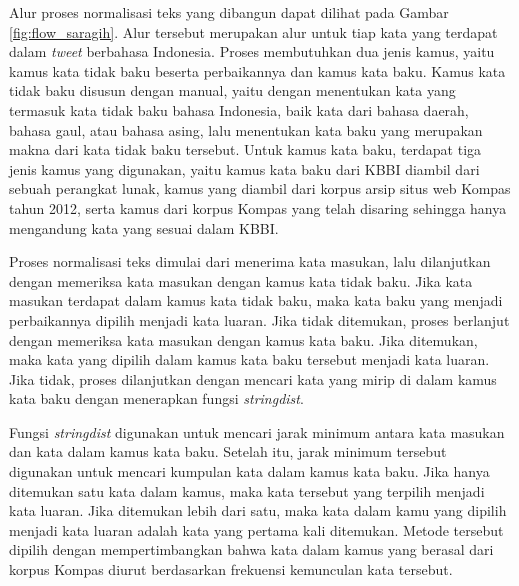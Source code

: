 Alur proses normalisasi teks yang dibangun dapat dilihat pada Gambar \ref{fig:flow_saragih}. Alur tersebut merupakan alur untuk tiap kata yang terdapat dalam \textit{tweet} berbahasa Indonesia. Proses membutuhkan dua jenis kamus, yaitu kamus kata tidak baku beserta perbaikannya dan kamus kata baku. Kamus kata tidak baku disusun dengan manual, yaitu dengan menentukan kata yang termasuk kata tidak baku bahasa Indonesia, baik kata dari bahasa daerah, bahasa gaul, atau bahasa asing, lalu menentukan kata baku yang merupakan makna dari kata tidak baku tersebut. Untuk kamus kata baku, terdapat tiga jenis kamus yang digunakan, yaitu kamus kata baku dari KBBI diambil dari sebuah perangkat lunak, kamus yang diambil dari korpus arsip situs web Kompas tahun 2012, serta kamus dari korpus Kompas yang telah disaring sehingga hanya mengandung kata yang sesuai dalam KBBI.

Proses normalisasi teks dimulai dari menerima kata masukan, lalu dilanjutkan dengan memeriksa kata masukan dengan kamus kata tidak baku. Jika kata masukan terdapat dalam kamus kata tidak baku, maka kata baku yang menjadi perbaikannya dipilih menjadi kata luaran. Jika tidak ditemukan, proses berlanjut dengan memeriksa kata masukan dengan kamus kata baku. Jika ditemukan, maka kata yang dipilih dalam kamus kata baku tersebut menjadi kata luaran. Jika tidak, proses dilanjutkan dengan mencari kata yang mirip di dalam kamus kata baku dengan menerapkan fungsi \textit{stringdist}.

Fungsi \textit{stringdist} digunakan untuk mencari jarak minimum antara kata masukan dan kata dalam kamus kata baku. Setelah itu, jarak minimum tersebut digunakan untuk mencari kumpulan kata dalam kamus kata baku. Jika hanya ditemukan satu kata dalam kamus, maka kata tersebut yang terpilih menjadi kata luaran. Jika ditemukan lebih dari satu, maka kata dalam kamu yang dipilih menjadi kata luaran adalah kata yang pertama kali ditemukan. Metode tersebut dipilih dengan mempertimbangkan bahwa kata dalam kamus yang berasal dari korpus Kompas diurut berdasarkan frekuensi kemunculan kata tersebut.


